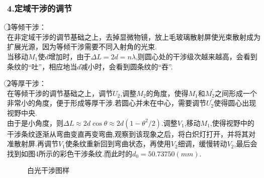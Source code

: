 \documentclass[12pt,a4paper,UTF8]{ctexart}
\begin{document}
\subsubsection*{4.定域干涉的调节}
\textcircled{1}等倾干涉：\\
在非定域干涉的调节基础之上，去掉显微物镜，放上毛玻璃散射屏使光束散射成为扩展光源，因为等倾干涉需要不同入射角的光束.\\
当移动$M_1$使$d$增加时，由于$\Delta L=2d=n\lambda$,则圆心处的干涉级次越来越高，会看到条纹的“吐”，相应地当$d$减小时，会看到圆条纹的“吞”.\par
\textcircled{2}等厚干涉：\\
在等倾干涉的调节基础之上，调节$U_2$,调整$M_2$的角度，使得$M_1$和$M_2^{\prime}$之间形成一个非常小的角度，便于形成等厚干涉.若圆心并未在中心，需要调节$U_2^{\prime}$使得圆心出现视野中央.\\
由于是小角度，则$\Delta L \approx 2d\cos\theta \approx 2d(1-\theta^2/2)$.调整$V_1$,移动$M_1$,使得视野中的干涉条纹逐渐从弯曲变直再变弯曲,观察到该现象之后，将白炽灯打开，并将其对准散射屏.再调节$V_1$使条纹重新回到弯曲状态，再使用$V_2$细调，缓慢转动$V_2$,最后会找到如图4所示的彩色干涉条纹.而此时的$d_0=50.73750(mm)$.
\begin{figure}[htbp]
		\centering
		\caption{白光干涉图样}
	\end{figure}
\end{document}
